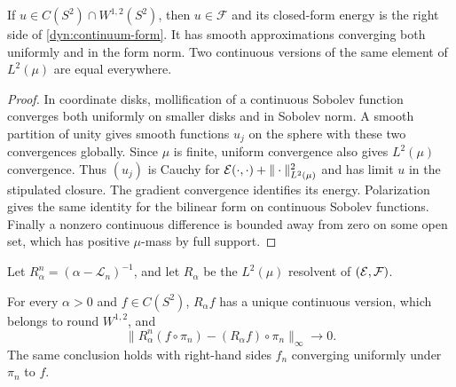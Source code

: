 \begin{lemma}
\label{dyn:smooth-core}
If $u\in C(S^2)\cap W^{1,2}(S^2)$, then $u\in\mathcal F$ and its
closed-form energy is the right side of
\eqref{dyn:continuum-form}.  It has smooth approximations converging
both uniformly and in the form norm.  Two continuous versions of
the same element of $L^2(\mu)$ are equal everywhere.
\end{lemma}

\begin{proof}
In coordinate disks, mollification of a continuous Sobolev function
converges both uniformly on smaller disks and in Sobolev norm.
A smooth partition of unity gives smooth functions $u_j$ on the
sphere with these two convergences globally.  Since $\mu$ is finite,
uniform convergence also gives $L^2(\mu)$ convergence.  Thus $(u_j)$
is Cauchy for $\mathcal E(\cdot,\cdot)+\|\cdot\|_{L^2(\mu)}^2$ and has
limit $u$ in the stipulated closure.  The gradient convergence
identifies its energy.  Polarization gives the same identity for
the bilinear form on continuous Sobolev functions.  Finally a
nonzero continuous difference is bounded away from zero on some
open set, which has positive $\mu$-mass by full support.
\end{proof}

Let $R^n_\alpha=(\alpha-\mathcal L_n)^{-1}$, and let $R_\alpha$ be the
$L^2(\mu)$ resolvent of $(\mathcal E,\mathcal F)$.

\begin{lemma}\label{dyn:resolvent}
For every $\alpha>0$ and $f\in C(S^2)$, $R_\alpha f$ has a unique
continuous version, which belongs to round $W^{1,2}$, and
\begin{equation}\label{dyn:resolvent-limit}
 \bigl\|R^n_\alpha(f\circ\pi_n)
              -(R_\alpha f)\circ\pi_n\bigr\|_\infty
       \longrightarrow0.
\end{equation}
The same conclusion holds with right-hand sides $f_n$ converging
uniformly under $\pi_n$ to $f$.
\end{lemma}

